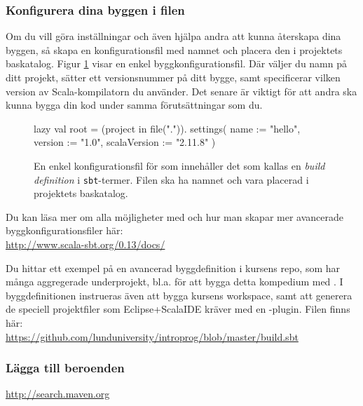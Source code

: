 \subsubsection{Konfigurera dina byggen i filen }

Om du vill göra inställningar och även hjälpa andra att kunna återskapa dina byggen, så skapa en konfigurationsfil med namnet  och placera den i projektets baskatalog. Figur \ref{fig:sbt:build-file} visar en enkel byggkonfigurationsfil. Där väljer du namn på ditt projekt, sätter ett versionsnummer på ditt bygge, samt specificerar vilken version av Scala-kompilatorn du använder. Det senare är viktigt för att andra ska kunna bygga din kod under samma förutsättningar som du. 

\begin{figure}[H]
\centering
\begin{Code}
lazy val root = (project in file(".")).
  settings(
    name := "hello",
    version := "1.0",
    scalaVersion := "2.11.8"
  )
\end{Code}
\caption{En enkel konfigurationsfil för \sbt som innehåller det som kallas en \textit{build definition} i \texttt{sbt}-termer. Filen ska ha namnet  och vara placerad i projektets baskatalog.}
\label{fig:sbt:build-file}
\end{figure}

\noindent Du kan läsa mer om alla möjligheter med \sbt och hur man skapar mer avancerade byggkonfigurationsfiler här: \\
\url{http://www.scala-sbt.org/0.13/docs/}

Du hittar ett exempel på en avancerad byggdefinition i kursens repo, som har många aggregerade underprojekt, bl.a. för att bygga detta kompedium med . I byggdefinitionen instrueras även \sbt att bygga kursens workspace, samt att generera de speciell projektfiler som Eclipse+ScalaIDE kräver med en \sbt-plugin. Filen finns här: \\
\url{https://github.com/lunduniversity/introprog/blob/master/build.sbt}

\subsubsection{Lägga till beroenden}

\TODO 

\url{http://search.maven.org}

